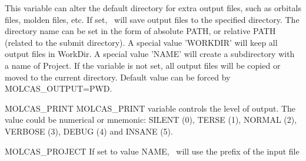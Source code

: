\begin{variablelist}
This variable can alter the default directory for extra output files,
such as orbitals files, molden files, etc.
If set, \molcas\ will save output files to the specified directory.
The directory name can be set in the form of absolute PATH, or
relative PATH (related to the submit directory).
A special value 'WORKDIR' will keep all output files in WorkDir.
A special value 'NAME' will create a subdirectory with a name of Project.
If the variable is not set, all output files will be copied or moved
to the current directory. Default value can be forced by MOLCAS\_OUTPUT=PWD.
\item[MOLCAS\_PRINT]
MOLCAS\_PRINT variable controls the level of output. The value could be numerical or mnemonic:
SILENT (0), TERSE (1), NORMAL (2), VERBOSE (3), DEBUG (4) and INSANE (5).
\item[MOLCAS\_PROJECT]
If set to value NAME, \molcas\ will use the prefix of the input file

\end{variablelist}
